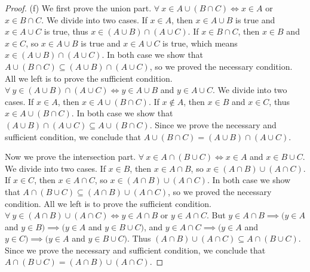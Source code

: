 \begin{proof}{(f)}
We first prove the union part.
\(\forall\ x \in A \cup (B \cap C) \iff x \in A\) or \(x \in B \cap C\).
We divide into two cases.
If \(x \in A\), then \(x \in A \cup B\) is true and \(x \in A \cup C\) is true, thus \(x \in (A \cup B) \cap (A \cup C)\).
If \(x \in B \cap C\), then \(x \in B\) and \(x \in C\), so \(x \in A \cup B\) is true and \(x \in A \cup C\) is true, which means \(x \in (A \cup B) \cap (A \cup C)\).
In both case we show that \(A \cup (B \cap C) \subseteq (A \cup B) \cap (A \cup C)\), so we proved the necessary condition.
All we left is to prove the sufficient condition.
\(\forall\ y \in (A \cup B) \cap (A \cup C) \iff y \in A \cup B\) and \(y \in A \cup C\).
We divide into two cases.
If \(x \in A\), then \(x \in A \cup (B \cap C)\).
If \(x \notin A\), then \(x \in B\) and \(x \in C\), thus \(x \in A \cup (B \cap C)\).
In both case we show that \((A \cup B) \cap (A \cup C) \subseteq A \cup (B \cap C)\).
Since we prove the necessary and sufficient condition, we conclude that \(A \cup (B \cap C) = (A \cup B) \cap (A \cup C)\).

Now we prove the intersection part.
\(\forall\ x \in A \cap (B \cup C) \iff x \in A\) and \(x \in B \cup C\).
We divide into two cases.
If \(x \in B\), then \(x \in A \cap B\), so \(x \in (A \cap B) \cup (A \cap C)\).
If \(x \in C\), then \(x \in A \cap C\), so \(x \in (A \cap B) \cup (A \cap C)\).
In both case we show that \(A \cap (B \cup C) \subseteq (A \cap B) \cup (A \cap C)\), so we proved the necessary condition.
All we left is to prove the sufficient condition.
\(\forall\ y \in (A \cap B) \cup (A \cap C) \iff y \in A \cap B\) or \(y \in A \cap C\).
But \(y \in A \cap B \implies (y \in A\) and \(y \in B) \implies (y \in A\) and \(y \in B \cup C)\), and \(y \in A \cap C \implies (y \in A\) and \(y \in C) \implies (y \in A\) and \(y \in B \cup C)\).
Thus \((A \cap B) \cup (A \cap C) \subseteq A \cap (B \cup C)\).
Since we prove the necessary and sufficient condition, we conclude that \(A \cap (B \cup C) = (A \cap B) \cup (A \cap C)\).
\end{proof}

